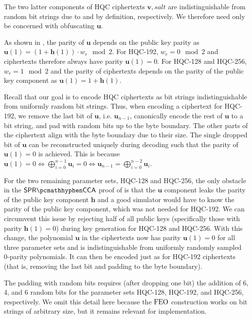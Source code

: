 The two latter components of HQC ciphertexts $\mathbf v, \mathit{salt}$ are indistinguishable from random bit strings due to \cite{EC:Xagawa22} and by definition, respectively. We therefore need only be concerned with obfuscating $\mathbf u$.

As shown in \cite{EC:Xagawa22}, the parity of $\mathbf u$ depends on the public key parity as $\mathbf u(1)=(1 + \mathbf h(1))\cdot w_r \mod 2$. For HQC-192, $w_r = 0 \mod 2$ and ciphertexts therefore always have parity $\mathbf u(1)=0$. For HQC-128 and HQC-256, $w_r = 1 \mod 2$ and the parity of ciphertexts depends on the parity of the public key component as $\mathbf u(1)=1 + \mathbf h(1)$.

Recall that our goal is to encode HQC ciphertexts as bit strings indistinguishable from uniformly random bit strings. Thus, when encoding a ciphertext for HQC-192, we remove the last bit of $\mathbf u$, i.e. $\mathbf u_{n-1}$, canonically encode the rest of $\mathbf u$ to a bit string, and pad with random bits up to the byte boundary. The other parts of the ciphertext align with the byte boundary due to their size. The single dropped bit of $\mathbf u$ can be reconstructed uniquely during decoding such that the parity of $\mathbf u(1)=0$ is achieved. This is because $\mathbf u(1)=0 \iff \bigoplus_{i=0}^{n-1} \mathbf u_i = 0 \iff \mathbf u_{n-1} = \bigoplus_{i=0}^{n-2} \mathbf u_i$.

For the two remaining parameter sets, HQC-128 and HQC-256, the only obstacle in the $\sprcca$ proof of \cite{EC:Xagawa22} is that the $\mathbf u$ component leaks the parity of the public key component $\mathbf h$ and a good simulator would have to know the parity of the public key component, which was not needed for HQC-192.
We can circumvent this issue by rejecting half of all public keys (specifically those with parity $\mathbf h(1)=0$) during key generation for HQC-128 and HQC-256.
With this change, the polynomial $\mathbf u$ in the ciphertexts now has parity $\mathbf u(1)=0$ for all three parameter sets and is indistinguishable from uniformly randomly sampled 0-parity polynomials. It can then be encoded just as for HQC-192 ciphertexts (that is, removing the last bit and padding to the byte boundary).

The padding with random bits requires (after dropping one bit) the addition of 6, 4, and 6 random bits for the parameter sets HQC-128, HQC-192, and HQC-256, respectively. We omit this detail here because the $\textsf{\textnormal{FEO}}$ construction works on bit strings of arbitrary size, but it remains relevant for implementation.

